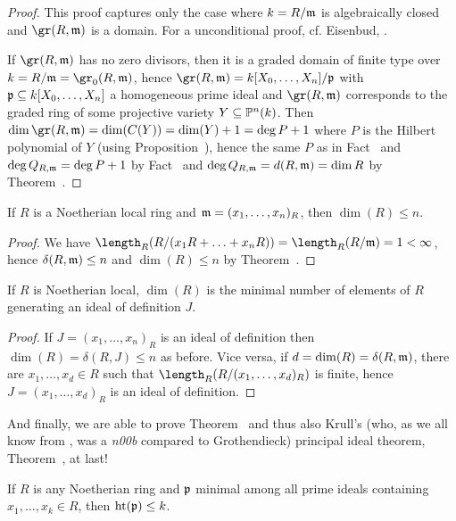 \documentclass[a4paper,parskip=half,numbers=enddot, DIV=12, headheight=30pt]{scrreprt}
\begin{document}
\begin{proof}
    This proof captures only the case where $k=R/\mathfrak{m}$ is algebraically closed and $\gr(R,\mm)$ is a domain. For a unconditional proof, cf. Eisenbud, \cite[Corollary~12.5]{eisenbudCommAlg}.
    
    If $\gr(R,\mm)$ has no zero divisors, then it is a graded domain of finite type over $k=R/\mm=\gr_0(R,\mm)$, hence $\gr(R,\mm) = k[X_0,\ldots, X_n]/\pp$ with $\mathfrak{p}\subseteq k[X_0,\ldots,X_n]$ a homogeneous prime ideal and $\gr(R,\mm)$ corresponds to the graded ring of some projective variety $Y\subseteq \mathbb{P}^{n}(k)$. Then $\dim\gr(R,\mm) = \dim(C(Y)) = \dim(Y) +1 = \deg P+1 $ where $P$ is the Hilbert polynomial of $Y$ (using Proposition~), hence the same $P$ as in Fact~ and $\deg Q_{R,\mathfrak{m}} = \deg P+1$ by Fact~ and $\deg Q_{R,\mathfrak{m}}=d(R,\mathfrak{m})=\dim R$ by Theorem~.
\end{proof}
\begin{cor}
    If $R$ is a Noetherian local ring and $\mathfrak{m} =( x_1,\ldots, x_n)_R$, then $\dim(R) \leq n$.
\end{cor}
\begin{proof}
    We have $\length_R(R/(x_1R+\ldots +x_nR) ) = \length_R(R/\mm) = 1< \infty$, hence $\delta(R,\mathfrak{m}) \leq n$ and $\dim(R) \leq n$ by Theorem~.
\end{proof}
\begin{cor}
    If $R$ is Noetherian local, $\dim(R)$ is the minimal number of elements of $R$ generating an ideal of definition $J$.
\end{cor}
\begin{proof}
    If $J= (x_1,\ldots,x_n)_R$ is an ideal of definition then $\dim(R) = \delta(R,J) \leq n$ as before. Vice versa, if $d=\dim(R) = \delta(R,\mathfrak{m})$, there are $x_1,\ldots, x_d\in R$ such that $\length_R(R/(x_1,\ldots, x_d)_R)$ is finite, hence $J= (x_1,\ldots, x_d)_R$ is an ideal of definition.
\end{proof}
And finally, we are able to prove Theorem~ and thus also Krull's (who, as we all know from \cite{alg1}, was a \emph{n00b} compared to Grothendieck) principal ideal theorem, Theorem~, at last!
\begin{cor}
    If $R$ is any Noetherian ring and $\mathfrak{p}$ minimal among all prime ideals containing $x_1,\ldots, x_k\in R$, then $\operatorname{ht}(\mathfrak{p}) \leq k$.
\end{cor}
\end{document}
